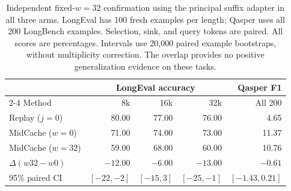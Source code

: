 \begin{table}[htbp]
\centering
\small
\setlength{\tabcolsep}{5pt}
\begin{tabular}{@{}lrrrr@{}}
\toprule
& \multicolumn{3}{c}{LongEval accuracy} & Qasper F1 \\
\cmidrule(lr){2-4}
Method & 8k & 16k & 32k & All 200 \\
\midrule
Replay ($j=0$) & 80.00 & 77.00 & 76.00 & 4.65 \\
MidCache ($w=0$) & 71.00 & 74.00 & 73.00 & 11.37 \\
MidCache ($w=32$) & 59.00 & 68.00 & 60.00 & 10.76 \\
\midrule
$\Delta(w32-w0)$ & $-12.00$ & $-6.00$ & $-13.00$ & $-0.61$ \\
95\% paired CI & $[-22,-2]$ & $[-15,3]$ & $[-25,-1]$ & $[-1.43,0.21]$ \\
\bottomrule
\end{tabular}
\caption{Independent fixed-$w=32$ confirmation using the principal suffix adapter in all three arms. LongEval has 100 fresh examples per length; Qasper uses all 200 LongBench examples. Selection, sink, and query tokens are paired. All scores are percentages. Intervals use 20,000 paired example bootstraps, without multiplicity correction. The overlap provides no positive generalization evidence on these tasks.}
\label{tab:overlap-confirmation}
\end{table}
